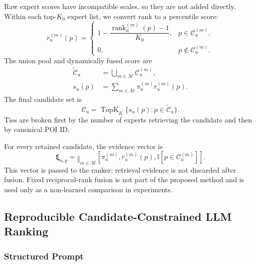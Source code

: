 \documentclass[journal]{IEEEtran}
\newcommand{\Experts}{\mathcal{M}}
\newcommand{\Ind}{\mathbb{I}}
\begin{document}
Raw expert scores have incompatible scales, so they are not added directly.
Within each top-$K_0$ expert list, we convert rank to a percentile score:
\begin{equation}
\overline r_{u}^{(m)}(p)
=
\begin{cases}
1-\dfrac{\operatorname{rank}_{u}^{(m)}(p)-1}{K_0},
&
p\in\mathcal{C}_{u}^{(m)},\\[7pt]
0,
&
p\notin\mathcal{C}_{u}^{(m)}.
\end{cases}
\label{eq:rank_percentile}
\end{equation}
The union pool and dynamically fused score are
\begin{align}
\widetilde{\mathcal{C}}_u
&=
\bigcup_{m\in\Experts}\mathcal{C}_{u}^{(m)},
\label{eq:union_pool}\\
s_u(p)
&=
\sum_{m\in\Experts}
\pi_u^{(m)}\overline r_u^{(m)}(p).
\label{eq:dynamic_fusion}
\end{align}
The final candidate set is
\begin{equation}
\mathcal{C}_u
=
\operatorname{TopK}_{K}
\{s_u(p):p\in\widetilde{\mathcal{C}}_u\}.
\label{eq:final_candidate}
\end{equation}
Ties are broken first by the number of experts retrieving the candidate and
then by canonical POI ID.

For every retained candidate, the evidence vector is
\begin{equation}
\bm{\xi}_{u,p}
=
\mathop{\Vert}_{m\in\Experts}
[
\pi_u^{(m)},
\overline r_u^{(m)}(p),
\Ind[p\in\mathcal{C}_u^{(m)}]
].
\label{eq:evidence_vector}
\end{equation}
This vector is passed to the ranker; retrieval evidence is not discarded after
fusion.
Fixed reciprocal-rank fusion is not part of the proposed method and is used
only as a non-learned comparison in experiments.

\subsection{Reproducible Candidate-Constrained LLM Ranking}
\label{subsec:ranker}

\subsubsection{Structured Prompt}
\end{document}
